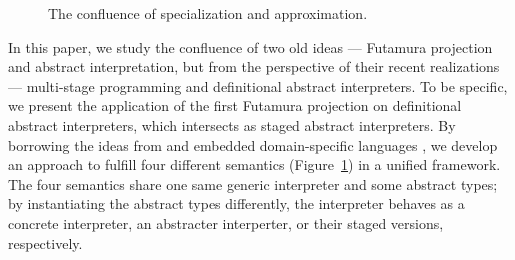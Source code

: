 \begin{figure}[h]
  \caption{The confluence of specialization and approximation.}
  \label{confluence}
\end{figure}

In this paper, we study the confluence of two old ideas --- Futamura projection
and abstract interpretation, but from the perspective of their recent
realizations --- multi-stage programming and definitional abstract interpreters.
To be specific, we present the application of the first Futamura projection on
definitional abstract interpreters, which intersects as staged abstract
interpreters. By borrowing the ideas from 
\cite{DBLP:conf/popl/LiangHJ95, DBLP:journals/pacmpl/DaraisLNH17,
Sergey:2013:MAI:2491956.2491979} and embedded domain-specific languages
\cite{DBLP:conf/snapl/RompfBLSJAOSKDK15, DBLP:journals/jfp/CaretteKS09,
DBLP:conf/icfp/GibbonsW14}, we develop an approach to fulfill four different
semantics (Figure~\ref{confluence}) in a unified framework. The four semantics
share one same generic interpreter and some abstract types; by instantiating the
abstract types differently, the interpreter behaves as a concrete interpreter,
an abstracter interperter, or their staged versions, respectively.

